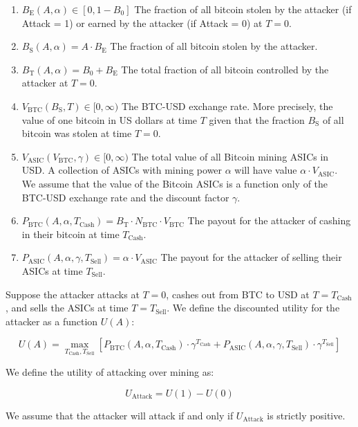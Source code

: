 \documentclass[12pt]{article}
\newcommand*{\Attack}{A}
\newcommand*{\Time}{T}
\newcommand*{\ABtcOrig}{{B_0}}
\newcommand*{\ABtcEarned}{{B_{\mathrm{E}}}}
\newcommand*{\ABtcStolen}{{B_{\mathrm{S}}}}
\newcommand*{\ABtcTotal}{{B_{\mathrm{T}}}}
\newcommand*{\NumBtc}{{N_{\mathrm{BTC}}}}
\newcommand*{\ExchgRate}{{V_{\mathrm{BTC}}}}
\newcommand*{\AsicValue}{{V_{\mathrm{ASIC}}}}
\newcommand*{\TimeCashOut}{{T_{\mathrm{Cash}}}}
\newcommand*{\TimeSellAsics}{{T_{\mathrm{Sell}}}}
\newcommand*{\Utility}{U}
\newcommand*{\AttackUtility}{{U_{\mathrm{Attack}}}}
\newcommand*{\PayoffBtc}{{P_{\mathrm{BTC}}}}
\newcommand*{\PayoffAsic}{{P_{\mathrm{ASIC}}}}
\newenvironment{defs}
  { \begin{enumerate}[labelindent=0pt,labelwidth=2.5in,itemindent=0em,align=parleft,leftmargin=!] }
  { \end{enumerate} }
\begin{document}
\begin{defs}
  \item[{$\ABtcEarned(\Attack, \alpha) \in [0, 1 - B_0]$}]
    The fraction of all bitcoin stolen by the attacker (if Attack = 1) or
    earned by the attacker (if Attack = 0) at $\Time = 0$.
  \item[{$\ABtcStolen(\Attack, \alpha)
      = \Attack \cdot \ABtcEarned$}]
    The fraction of all bitcoin stolen by the attacker.
  \item[{$\ABtcTotal(\Attack, \alpha)
      = \ABtcOrig + \ABtcEarned$}]
    The total fraction of all bitcoin controlled by the attacker at $\Time = 0$.
  \item[{$\ExchgRate(\ABtcStolen, \Time) \in [0, \infty)$}]
    The BTC-USD exchange rate. More precisely, the value of one bitcoin in US
    dollars at time $\Time$ given that the fraction $\ABtcStolen$ of all
    bitcoin was stolen at time $\Time = 0$.
  \item[{$\AsicValue(\ExchgRate, \gamma) \in [0, \infty)$}]
    The total value of all Bitcoin mining ASICs in USD. A collection of ASICs
    with mining power $\alpha$ will have value $\alpha \cdot
    \AsicValue$.
    We assume that the value of the Bitcoin ASICs is a function only of the
    BTC-USD exchange rate and the discount factor $\gamma$.
  \item[{$\PayoffBtc(\Attack, \alpha, \TimeCashOut)
      = \ABtcTotal \cdot \NumBtc \cdot \ExchgRate$}]
    The payout for the attacker of cashing in their bitcoin at time $\TimeCashOut$.
  \item[{$\PayoffAsic(\Attack, \alpha, \gamma, \TimeSellAsics)
      = \alpha \cdot \AsicValue$}]
    The payout for the attacker of selling their ASICs at time $\TimeSellAsics$.
\end{defs}

Suppose the attacker attacks at $\Time = 0$, cashes out from BTC to USD at
$\Time = \TimeCashOut$, and sells the ASICs at time $\Time = \TimeSellAsics$.
We define the discounted utility for the attacker as a function
$\Utility(\Attack)$:

\[
  \Utility(\Attack) =
  \max_{\TimeCashOut, \TimeSellAsics}
    \left[
        \PayoffBtc(\Attack, \alpha, \TimeCashOut)
          \cdot \gamma^\TimeCashOut
        + \PayoffAsic(\Attack, \alpha, \gamma, \TimeSellAsics)
          \cdot \gamma^\TimeSellAsics
    \right]
\]

We define the utility of attacking over mining as:

\[
  \AttackUtility = \Utility(1) - \Utility(0)
\]

We assume that the attacker will attack if and only if $\AttackUtility$ is
strictly positive.
\end{document}

